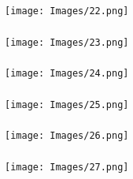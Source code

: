 \documentclass[serif,professionalfont,red,aspectratio=169]{beamer}
\begin{document}
\begin{frame}[t]
\frametitle{}
\begin{center}
  \begin{figure}
  \texttt{[image: Images/22.png]}
\end{figure} 
\end{center}
\end{frame}
\begin{frame}[t]
\frametitle{}
\begin{center}
  \begin{figure}
  \texttt{[image: Images/23.png]}
\end{figure} 
\end{center}
\end{frame}
\begin{frame}[t]
\frametitle{}
\begin{center}
  \begin{figure}
  \texttt{[image: Images/24.png]}
\end{figure} 
\end{center}
\end{frame}
\begin{frame}[t]
\frametitle{}
\begin{center}
  \begin{figure}
  \texttt{[image: Images/25.png]}
\end{figure} 
\end{center}
\end{frame}
\begin{frame}[t]
\frametitle{}
\begin{center}
  \begin{figure}
  \texttt{[image: Images/26.png]}
\end{figure} 
\end{center}
\end{frame}
\begin{frame}[t]
\frametitle{}
\begin{center}
  \begin{figure}
  \texttt{[image: Images/27.png]}
\end{figure} 
\end{center}
\end{frame}
\end{document}
